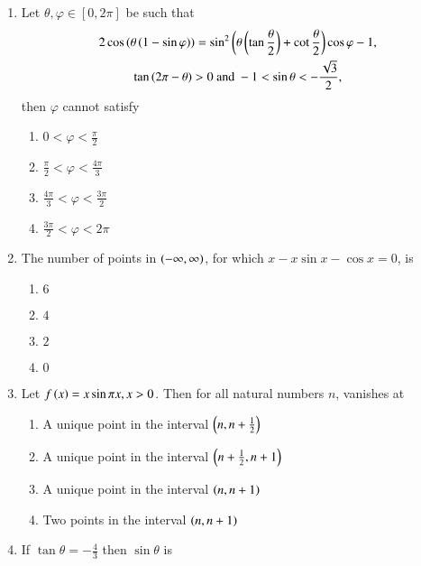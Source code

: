 \begin{enumerate}[label=\thesubsection.\arabic*,ref=\thesubsection.\theenumi]
\item Let $\theta, \varphi \in [0,2\pi]$ be such that 
\begin{multline*}
	2 \cos\left(\theta\left(1-\sin \varphi\right)\right)= \sin^2\left(\theta\left(\tan\frac{\theta}{2}\right)+\cot\frac{\theta}{2}\right)\cos \varphi-1, 
	\\
\tan\left(2\pi-\theta\right)>0 \text{ and } -1<\sin{\theta}<-\frac{\sqrt{3}}{2}, 
\end{multline*}
then $\varphi$ cannot satisfy \hfill{}
\begin{multicols}{4}
\begin{enumerate}
    \item $0<\varphi<\frac{\pi}{2}$
    \item $\frac{\pi}{2}<\varphi<\frac{4\pi}{3}$
    \item $\frac{4\pi}{3}<\varphi<\frac{3\pi}{2}$
    \item $\frac{3\pi}{2}<\varphi<2\pi$
\end{enumerate}
\end{multicols}
\item The number of points in $\left(-\infty, \infty\right)$, for which $x - x \sin x - \cos x = 0$, is \hfill{}
\begin{multicols}{4}
\begin{enumerate}
    \item $6$
    \item $4$
    \item $2$
    \item $0$
\end{enumerate}
\end{multicols}
\item Let $f\left(x\right)=x\sin\pi x,  x>0 $. Then for all  natural numbers $n$,  vanishes at 
\hfill{}
\begin{enumerate}
    \item A unique point in the interval $\left(n,n+\frac{1}{2}\right)$
    \item A unique point in the interval $\left(n+\frac{1}{2},n+1\right)$
    \item A unique point in the interval $\left(n,n+1\right)$
    \item Two points in the interval $\left(n,n+1\right)$
\end{enumerate}
	\item If $\tan\theta =-\frac{4}{3}$ then $\sin \theta$ is 
		
		\hfill{}
		

\end{enumerate}
